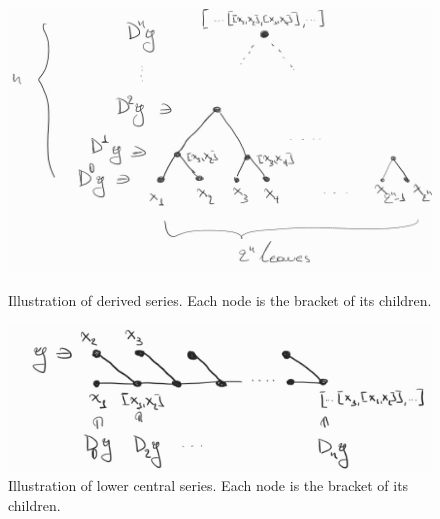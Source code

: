 \documentclass{report}
\begin{document}
\begin{figure}[ht]
    \centering
    \begin{minipage}[b]{0.55\linewidth}
        \centering
        \includegraphics[width=\textwidth]{derived_series_tree.jpg}
        \caption{Illustration of derived series. Each node is the bracket of its children.}
        \label{fig:derived_series}
    \end{minipage}
    \hfill
    \begin{minipage}[b]{0.4\linewidth}
        \centering
        \includegraphics[width=\textwidth]{lower_central_series_graph.jpg}
        \caption{Illustration of lower central series. Each node is the bracket of its children.}
        \label{fig:lower_central_series}
    \end{minipage}
\end{figure}
\end{document}
